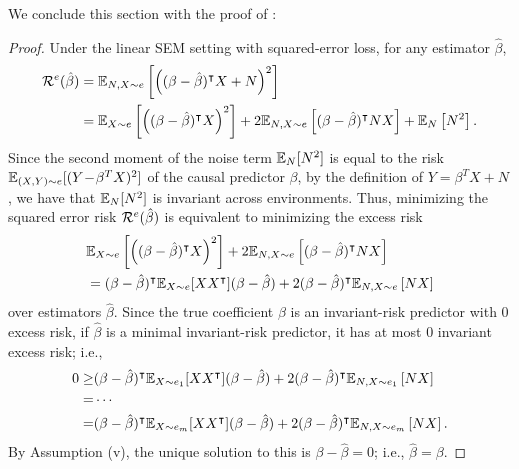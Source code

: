 \documentclass{article}
\begin{document}
%
%
%
%
%
%
%
%

%

We conclude this section with the proof of :
\begin{proof}
    Under the linear SEM setting with squared-error loss, for any estimator $\hat\beta$,
    \begin{align*}
        \mathcal{R}^e(\hat\beta)
        & = \mathbb{E}_{N, X \sim e} \left[ \left( (\beta - \hat \beta)^\intercal X + N \right)^2 \right] \\
        & = \mathbb{E}_{X \sim e} \left[ \left( (\beta - \hat \beta)^\intercal X \right)^2 \right] + 2\mathbb{E}_{N,X \sim e} \left[ (\beta - \hat \beta)^\intercal N X \right] + \mathbb{E}_N \left[ N^2 \right]. \\
    \end{align*}
    Since the second moment of the noise term $\mathbb{E}_N[N^2]$ is equal to the risk $\operatorname{\mathbb{E}}_{(X,Y) \sim e}[(Y\! -\! \beta^T X)^2]$ of the causal predictor $\beta$, by the definition of $Y = \beta^T X + N$, we have that $\mathbb{E}_N[N^2]$ is invariant across environments.
    Thus, minimizing the squared error risk $\mathcal{R}^e(\hat\beta)$ is equivalent to minimizing the excess risk
    \begin{align*}
        & \mathbb{E}_{X \sim e} \left[ \left( (\beta - \hat \beta)^\intercal X \right)^2 \right]
            + 2\mathbb{E}_{N,X \sim e} \left[ (\beta - \hat \beta)^\intercal N X \right] \\
        & = (\beta - \hat \beta)^\intercal \mathbb{E}_{X \sim e}[X X^\intercal] (\beta - \hat \beta)
            + 2(\beta - \hat \beta)^\intercal \mathbb{E}_{N,X \sim e} \left[ N X \right]
    \end{align*}
    over estimators $\hat\beta$.
    Since the true coefficient $\beta$ is an invariant-risk predictor with $0$ excess risk, if $\hat\beta$ is a minimal invariant-risk predictor, it has at most $0$ invariant excess risk; i.e.,
    \begin{align}
        \notag
        0 \geq
        & (\beta - \hat \beta)^\intercal \mathbb{E}_{X \sim e_1}[X X^\intercal] (\beta - \hat \beta)
            + 2(\beta - \hat \beta)^\intercal \mathbb{E}_{N,X \sim e_1} \left[ N X \right] \\
        \notag
        = & \cdots \\
        \label{eq:equal_squared_error_risks}
        = & (\beta - \hat \beta)^\intercal \mathbb{E}_{X \sim e_m}[X X^\intercal] (\beta - \hat \beta)
            + 2(\beta - \hat \beta)^\intercal \mathbb{E}_{N,X \sim e_m} \left[ N X \right].
    \end{align}
    By Assumption (v), the unique solution to this is $\beta - \hat\beta = 0$; i.e., $\hat\beta = \beta$.
\end{proof}
\end{document}
